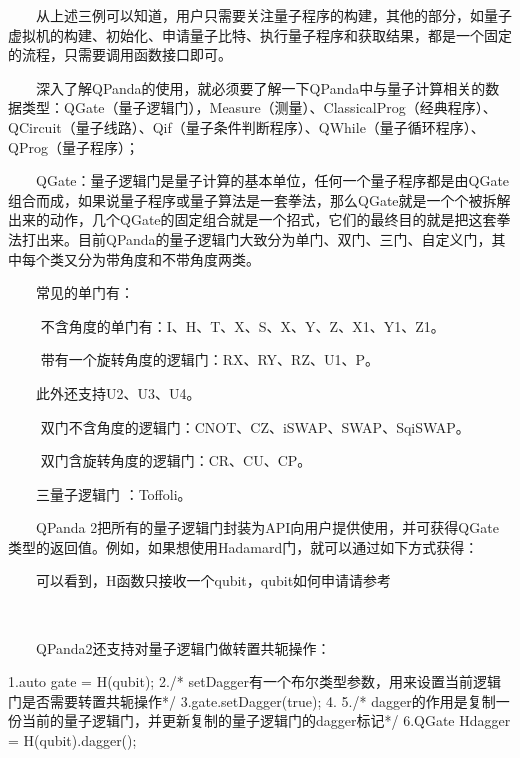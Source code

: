 \documentclass[a4paper,11pt,english]{sphinxmanual}
\begin{document}
\sphinxAtStartPar
  从上述三例可以知道，用户只需要关注量子程序的构建，其他的部分，如量子虚拟机的构建、初始化、申请量子比特、执行量子程序和获取结果，都是一个固定的流程，只需要调用函数接口即可。

\sphinxAtStartPar
  深入了解QPanda的使用，就必须要了解一下QPanda中与量子计算相关的数据类型：QGate（量子逻辑门），Measure（测量）、ClassicalProg（经典程序）、QCircuit（量子线路）、Qif（量子条件判断程序）、QWhile（量子循环程序）、QProg（量子程序）；

\sphinxAtStartPar
  QGate：量子逻辑门是量子计算的基本单位，任何一个量子程序都是由QGate组合而成，如果说量子程序或量子算法是一套拳法，那么QGate就是一个个被拆解出来的动作，几个QGate的固定组合就是一个招式，它们的最终目的就是把这套拳法打出来。目前QPanda的量子逻辑门大致分为单门、双门、三门、自定义门，其中每个类又分为带角度和不带角度两类。

\sphinxAtStartPar
  常见的单门有：

\sphinxAtStartPar
​   不含角度的单门有：I、H、T、X、S、X、Y、Z、X1、Y1、Z1。

\sphinxAtStartPar
​   带有一个旋转角度的逻辑门：RX、RY、RZ、U1、P。

\sphinxAtStartPar
  此外还支持U2、U3、U4。

\sphinxAtStartPar
​   双门不含角度的逻辑门：CNOT、CZ、iSWAP、SWAP、SqiSWAP。

\sphinxAtStartPar
​   双门含旋转角度的逻辑门：CR、CU、CP。

\sphinxAtStartPar
  三量子逻辑门 ：Toffoli。

\sphinxAtStartPar
  QPanda 2把所有的量子逻辑门封装为API向用户提供使用，并可获得QGate类型的返回值。例如，如果想使用Hadamard门，就可以通过如下方式获得：

\begin{sphinxVerbatim}[commandchars=\\\{\}]
   
\end{sphinxVerbatim}

\sphinxAtStartPar
  可以看到，H函数只接收一个qubit，qubit如何申请请参考

\sphinxAtStartPar

\sphinxAtStartPar
  QPanda2还支持对量子逻辑门做转置共轭操作：

\begin{sphinxVerbatim}[commandchars=\\\{\}]
1.auto gate = H(qubit);
2./* setDagger有一个布尔类型参数，用来设置当前逻辑门是否需要转置共轭操作*/
3.gate.setDagger(true);
4.
5./* dagger的作用是复制一份当前的量子逻辑门，并更新复制的量子逻辑门的dagger标记*/
6.QGate H\PYGZus{}dagger = H(qubit).dagger();
\end{sphinxVerbatim}
\end{document}
